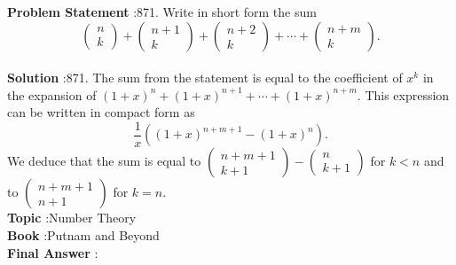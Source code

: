 \documentclass[10pt]{article}
\begin{document}
\textbf{Problem Statement} :871. Write in short form the sum$$ \left(\begin{array}{l} n \\ k \end{array}\right)+\left(\begin{array}{c} n+1 \\ k \end{array}\right)+\left(\begin{array}{c} n+2 \\ k \end{array}\right)+\cdots+\left(\begin{array}{c} n+m \\ k \end{array}\right) . $$\\
\textbf{Solution} :871. The sum from the statement is equal to the coefficient of $x^{k}$ in the expansion of $(1+x)^{n}+(1+x)^{n+1}+\cdots+(1+x)^{n+m}$. This expression can be written in compact form as $$ \frac{1}{x}\left((1+x)^{n+m+1}-(1+x)^{n}\right) . $$We deduce that the sum is equal to $\left(\begin{array}{c}n+m+1 \\ k+1\end{array}\right)-\left(\begin{array}{c}n \\ k+1\end{array}\right)$ for $k<n$ and to $\left(\begin{array}{c}n+m+1 \\ n+1\end{array}\right)$ for $k=n$. \\
\textbf{Topic} :Number Theory\\
\textbf{Book} :Putnam and Beyond\\
\textbf{Final Answer} :\\
\end{document}
